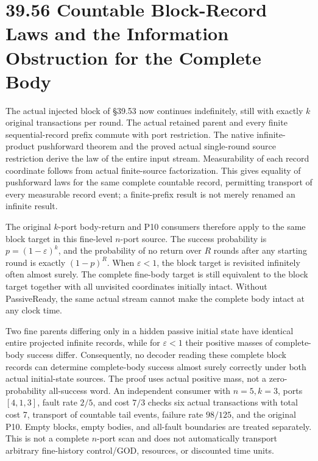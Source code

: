 \documentclass[
  english,
  11pt,
  oneside]{book}
\begin{document}
\section{39.56 Countable Block-Record Laws and the Information Obstruction for the Complete Body}\label{countable-block-record-laws-and-the-information-obstruction-for-the-complete-body}

The actual injected block of §39.53 now continues indefinitely, still with exactly \(k\) original transactions per round. The actual retained parent and every finite sequential-record prefix commute with port restriction. The native infinite-product pushforward theorem and the proved actual single-round source restriction derive the law of the entire input stream. Measurability of each record coordinate follows from actual finite-source factorization. This gives equality of pushforward laws for the same complete countable record, permitting transport of every measurable record event; a finite-prefix result is not merely renamed an infinite result.

The original \(k\)-port body-return and P10 consumers therefore apply to the same block target in this fine-level \(n\)-port source. The success probability is \(p=(1-\varepsilon)^k\), and the probability of no return over \(R\) rounds after any starting round is exactly \((1-p)^R\). When \(\varepsilon<1\), the block target is revisited infinitely often almost surely. The complete fine-body target is still equivalent to the block target together with all unvisited coordinates initially intact. Without PassiveReady, the same actual stream cannot make the complete body intact at any clock time.

Two fine parents differing only in a hidden passive initial state have identical entire projected infinite records, while for \(\varepsilon<1\) their positive masses of complete-body success differ. Consequently, no decoder reading these complete block records can determine complete-body success almost surely correctly under both actual initial-state sources. The proof uses actual positive mass, not a zero-probability all-success word. An independent consumer with \(n=5,k=3\), ports \([4,1,3]\), fault rate \(2/5\), and cost \(7/3\) checks six actual transactions with total cost 7, transport of countable tail events, failure rate \(98/125\), and the original P10. Empty blocks, empty bodies, and all-fault boundaries are treated separately. This is not a complete \(n\)-port scan and does not automatically transport arbitrary fine-history control/GOD, resources, or discounted time units.
\end{document}
